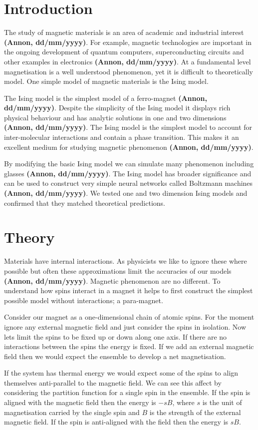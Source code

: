 \documentclass[a4paper, twocolumn]{article}
\def\citation{{\bfseries (Annon, dd/mm/yyyy)}}
\begin{document}
\newpage
\newpage
\section*{Introduction}
The study of magnetic materials is an area of academic %
and industrial interest \citation. For example, magnetic %
technologies are important in the ongoing development of %
quantum computers, superconducting circuits and other %
examples in electronics \citation. At a fundamental level %
magnetisation is a well understood phenomenon, yet it is %
difficult to theoretically model. One simple model of magnetic %
materials is the Ising model. 


The Ising model is the simplest model of a ferro-magnet \citation. %
Despite the simplicity of the Ising model it displays rich %
physical behaviour and has analytic solutions in one and %
two dimensions \citation.  The Ising model is the simplest model %
to account for inter-molecular interactions and contain a phase %
transition. This makes it an excellent medium for studying %
magnetic phenomenon \citation. 


By modifying the basic Ising model we can simulate many %
phenomenon including glasses \citation. The Ising model %
has broader significance and can be used to construct very %
simple neural networks called Boltzmann machines \citation. We tested %
one and two dimension Ising models and confirmed that they %
matched theoretical predictions.


\section*{Theory}
Materials have internal interactions. As physicists we like %
to ignore these where possible but often these approximations %
limit the accuracies of our models \citation. Magnetic %
phenomenon are no different. To understand how spins interact %
in a magnet it helps to first construct the simplest possible %
model without interactions; a para-magnet.


Consider our magnet as a one-dimensional chain of atomic spins. %
For the moment ignore any external magnetic field and just %
consider the spins in isolation. Now lets limit the spins to %
be fixed up or down along one axis. If there are no interactions %
between the spins the energy is fixed. If we add an external %
magnetic field then we would expect the ensemble to develop a %
net magnetisation.


If the system has thermal energy we would expect some of the %
spins to align themselves anti-parallel to the magnetic field. %
We can see this affect by considering the partition function %
for a single spin in the ensemble. If the spin is aligned with %
the magnetic field then the energy is \(-sB\), where \(s\) is %
the unit of magnetisation carried by the single spin and \(B\) %
is the strength of the external magnetic field. If the spin is %
anti-aligned with the field then the energy is \(sB\). 
\end{document}
